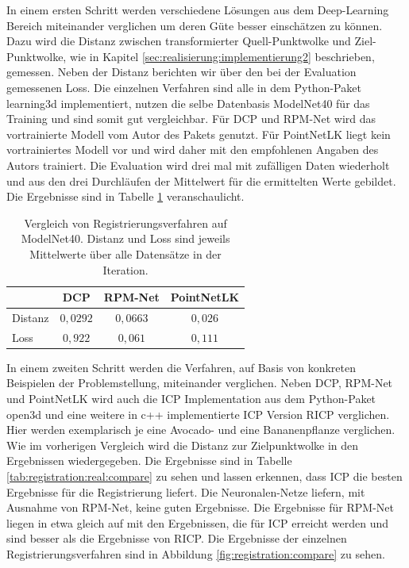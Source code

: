 \documentclass[12pt,titlepage, twoside]{article}
\begin{document}
In einem ersten Schritt werden verschiedene Lösungen aus dem Deep-Learning Bereich miteinander verglichen um deren Güte besser einschätzen zu können.
Dazu wird die Distanz zwischen transformierter Quell-Punktwolke und Ziel-Punktwolke, wie in Kapitel \ref{sec:realisierung:implementierung2} beschrieben, gemessen. 
Neben der Distanz berichten wir über den bei der Evaluation gemessenen Loss.
Die einzelnen Verfahren sind alle in dem Python-Paket learning3d \cite{learning3d} implementiert, nutzen die selbe Datenbasis ModelNet40 für das Training und sind somit gut vergleichbar. 
Für DCP und RPM-Net wird das vortrainierte Modell vom Autor des Pakets genutzt.
Für PointNetLK liegt kein vortrainiertes Modell vor und wird daher mit den empfohlenen Angaben des Autors trainiert. 
Die Evaluation wird drei mal mit zufälligen Daten wiederholt und aus den drei Durchläufen der Mittelwert für die ermittelten Werte gebildet.
Die Ergebnisse sind in Tabelle \ref{tab:registration:deeplearn:compare} veranschaulicht.

\begin{table}
\begin{center}
\begin{tabular}{|l || c | c | c | } 
    \hline
     & DCP & RPM-Net & PointNetLK \\  
    \hline
    \hline
    Distanz & $0,0292$ & $0,0663$& $0,026$\\
    \hline
    Loss & $0,922$& $0,061$& $0,111$\\
    \hline
\end{tabular}
\end{center}
\caption{Vergleich von Registrierungsverfahren auf ModelNet40. Distanz und Loss sind jeweils Mittelwerte über alle Datensätze in der Iteration.}
\label{tab:registration:deeplearn:compare}
\end{table}

In einem zweiten Schritt werden die Verfahren, auf Basis von konkreten Beispielen der Problemstellung, miteinander verglichen. 
Neben DCP, RPM-Net und PointNetLK wird auch die ICP Implementation aus dem Python-Paket open3d \cite{zhou2018open3d} und eine weitere in c++ implementierte ICP Version RICP verglichen.
Hier werden exemplarisch je eine Avocado- und eine Bananenpflanze verglichen. Wie im vorherigen Vergleich wird die Distanz zur Zielpunktwolke in den Ergebnissen wiedergegeben.
Die Ergebnisse sind in Tabelle \ref{tab:registration:real:compare} zu sehen und lassen erkennen, dass ICP die besten Ergebnisse für die Registrierung liefert. 
Die Neuronalen-Netze liefern, mit Ausnahme von RPM-Net, keine guten Ergebnisse. 
Die Ergebnisse für RPM-Net liegen in etwa gleich auf mit den Ergebnissen, die für ICP erreicht werden und sind besser als die Ergebnisse von RICP. Die Ergebnisse der einzelnen Registrierungsverfahren sind in Abbildung \ref{fig:registration:compare} zu sehen.
\end{document}
